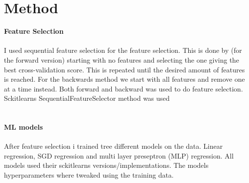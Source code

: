 \documentclass[12pt, letterpaper, twoside]{article}
\begin{document}
\section{Method}
\textbf{Feature Selection}\\
\ \\
I used sequential feature selection for the feature selection. This is done by (for the forward version) starting with no features and selecting the one giving the best cross-validation score. This is repeated until the desired amount of features is reached. For the backwards method we start with all features and remove one at a time instead. Both forward and backward was used to do feature selection. Sckitlearns SequentialFeatureSelector method was used\\
\ \\
\ \\
\textbf{ML models}\\
\ \\
After feature selection i trained tree different models on the data. Linear regression, SGD regression and multi layer preseptron (MLP) regression. All models used their sckitlearns versions/implementations. The models hyperparameters where tweaked using the training data.\\
\ \\
\ \\
\end{document}
